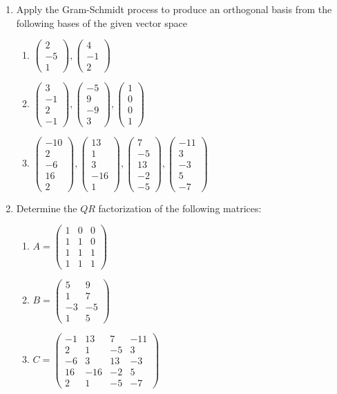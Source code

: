 \documentclass[12pt]{article}
\numberwithin{equation}{subsection}
\numberwithin{figure}{subsection}
\theoremstyle{note}
\newcommand\m[1]{\begin{pmatrix}#1\end{pmatrix}}
\begin{document}
\begin{enumerate}[label=\arabic*.]
\item Apply the Gram-Schmidt process to produce an orthogonal basis from the following bases of the given vector space
\begin{enumerate}
	\item $\m{2 \\ -5 \\1},\m{4 \\ -1 \\2}$
	\item $\m{3 \\ -1 \\ 2 \\ -1}, \m{-5 \\ 9 \\ -9 \\ 3}, \m{ 1\\ 0 \\  0 \\ 1}$
	\item $\m{-10\\2\\-6\\16\\2}, \m{13 \\ 1\\ 3\\-16\\1}, \m{7\\-5\\13\\-2\\-5}, \m{-11\\3\\-3\\5\\-7}$
\end{enumerate}

\item Determine the $QR$ factorization of the following matrices:
\begin{enumerate}
	\item $A=\m{1 & 0 & 0 \\ 1 & 1 & 0 \\ 1 & 1 & 1 \\ 1 & 1 & 1}$
	\item $B=\m{5 & 9 \\ 1 & 7 \\ -3 & -5 \\ 1 & 5}$
	\item $C=\m{-1 & 13 & 7 & -11 \\ 2 & 1 & -5 & 3\\ -6 & 3 & 13 & -3 \\ 16 & -16 & -2 & 5 \\ 2 & 1 & -5 & -7}$
\end{enumerate}


\end{enumerate}
\end{document}
